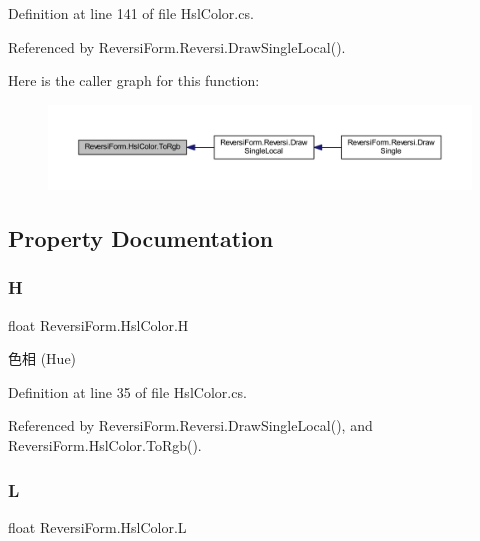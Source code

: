 Definition at line 141 of file Hsl\+Color.\+cs.



Referenced by Reversi\+Form.\+Reversi.\+Draw\+Single\+Local().

Here is the caller graph for this function\+:\nopagebreak
\begin{figure}[H]
\begin{center}
\leavevmode
\includegraphics[width=350pt]{class_reversi_form_1_1_hsl_color_aa7036039dd3abc7a1216be97656467df_icgraph}
\end{center}
\end{figure}


\subsection{Property Documentation}
\mbox{\label{class_reversi_form_1_1_hsl_color_ac1a2beeeae8bc7b8484ae7f3558fea53}} 
\subsubsection{\texorpdfstring{H}{H}}
{\footnotesize\ttfamily float Reversi\+Form.\+Hsl\+Color.\+H\hspace{0.3cm}{\ttfamily [get]}}



色相 (Hue) 



Definition at line 35 of file Hsl\+Color.\+cs.



Referenced by Reversi\+Form.\+Reversi.\+Draw\+Single\+Local(), and Reversi\+Form.\+Hsl\+Color.\+To\+Rgb().

\mbox{\label{class_reversi_form_1_1_hsl_color_a89e26c46eff241c066507625ddd5dc22}} 
\subsubsection{\texorpdfstring{L}{L}}
{\footnotesize\ttfamily float Reversi\+Form.\+Hsl\+Color.\+L\hspace{0.3cm}{\ttfamily [get]}}



